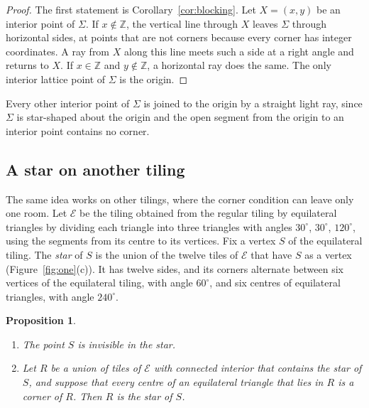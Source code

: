 \documentclass[11pt,a4paper]{article}
\theoremstyle{plain}
\newtheorem{proposition}[theorem]{Proposition}
\theoremstyle{definition}
\theoremstyle{remark}
\newcommand{\Z}{\mathbb{Z}}
\newcommand{\E}{\mathcal{E}}
\newcommand{\dg}{^\circ}
\numberwithin{equation}{section}
\begin{document}
\begin{proof}
The first statement is Corollary~\ref{cor:blocking}. Let $X=(x,y)$ be an interior point of $\Sigma$. If $x\notin\Z$, the vertical line through $X$ leaves $\Sigma$ through horizontal sides, at points that are not corners because every corner has integer coordinates. A ray from $X$ along this line meets such a side at a right angle and returns to $X$. If $x\in\Z$ and $y\notin\Z$, a horizontal ray does the same. The only interior lattice point of $\Sigma$ is the origin.
\end{proof}

Every other interior point of $\Sigma$ is joined to the origin by a straight light ray, since $\Sigma$ is star-shaped about the origin and the open segment from the origin to an interior point contains no corner.

\subsection{A star on another tiling}
The same idea works on other tilings, where the corner condition can leave only one room. Let $\E$ be the tiling obtained from the regular tiling by equilateral triangles by dividing each triangle into three triangles with angles $30\dg$, $30\dg$, $120\dg$, using the segments from its centre to its vertices. Fix a vertex $S$ of the equilateral tiling. The \emph{star} of $S$ is the union of the twelve tiles of $\E$ that have $S$ as a vertex (Figure~\ref{fig:one}(c)). It has twelve sides, and its corners alternate between six vertices of the equilateral tiling, with angle $60\dg$, and six centres of equilateral triangles, with angle $240\dg$.

\begin{proposition}\label{prop:star}
\begin{enumerate}[label=\textup{(\alph*)}]
\item The point $S$ is invisible in the star.
\item Let $R$ be a union of tiles of $\E$ with connected interior that contains the star of $S$, and suppose that every centre of an equilateral triangle that lies in $R$ is a corner of $R$. Then $R$ is the star of $S$.
\end{enumerate}
\end{proposition}
\end{document}
